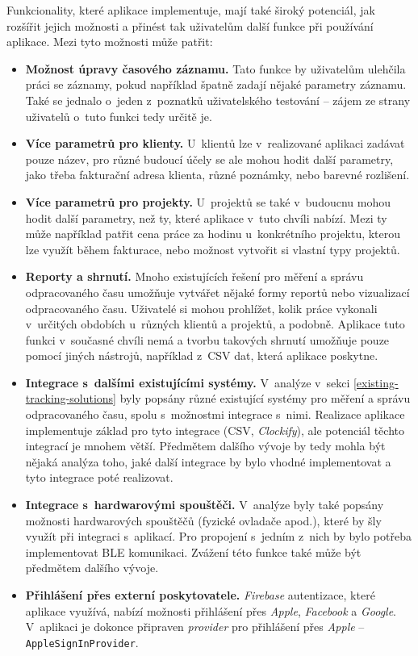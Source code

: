 Funkcionality, které aplikace implementuje, mají také široký potenciál, jak rozšířit jejich možnosti a přinést tak uživatelům další funkce při používání aplikace. Mezi tyto možnosti může patřit:
\begin{itemize}
\item\textbf{Možnost úpravy časového záznamu.} Tato funkce by uživatelům ulehčila práci se záznamy, pokud například špatně zadají nějaké parametry záznamu. Také se jednalo o~jeden z~poznatků uživatelského testování – zájem ze strany uživatelů o~tuto funkci tedy určitě je.
\item\textbf{Více parametrů pro klienty.} U~klientů lze v~realizované aplikaci zadávat pouze název, pro různé budoucí účely se ale mohou hodit další parametry, jako třeba fakturační adresa klienta, různé poznámky, nebo barevné rozlišení.
\item\textbf{Více parametrů pro projekty.} U~projektů se také v~budoucnu mohou hodit další parametry, než ty, které aplikace v~tuto chvíli nabízí. Mezi ty může například patřit cena práce za hodinu u~konkrétního projektu, kterou lze využít během fakturace, nebo možnost vytvořit si vlastní typy projektů. 
\item\textbf{Reporty a shrnutí.} Mnoho existujících řešení pro měření a správu odpracovaného času umožňuje vytvářet nějaké formy reportů nebo vizualizací odpracovaného času. Uživatelé si mohou prohlížet, kolik práce vykonali v~určitých obdobích u~různých klientů a projektů, a podobně. Aplikace tuto funkci v~současné chvíli nemá a tvorbu takových shrnutí umožňuje pouze pomocí jiných nástrojů, například z~CSV dat, která aplikace poskytne.
\item\textbf{Integrace s~dalšími existujícími systémy.} V~analýze v~sekci \ref{existing-tracking-solutions} byly popsány různé existující systémy pro měření a správu odpracovaného času, spolu s~možnostmi integrace s~nimi. Realizace aplikace implementuje základ pro tyto integrace (CSV, \emph{Clockify}), ale potenciál těchto integrací je mnohem větší. Předmětem dalšího vývoje by tedy mohla být nějaká analýza toho, jaké další integrace by bylo vhodné implementovat a tyto integrace poté realizovat.
\item\textbf{Integrace s~hardwarovými spouštěči.} V~analýze byly také popsány možnosti hardwarových spouštěčů (fyzické ovladače apod.), které by šly využít při integraci s~aplikací. Pro propojení s~jedním z~nich by bylo potřeba implementovat BLE komunikaci. Zvážení této funkce také může být předmětem dalšího vývoje.
\item\textbf{Přihlášení přes externí poskytovatele.} \emph{Firebase} autentizace, které aplikace využívá, nabízí možnosti přihlášení přes \emph{Apple}, \emph{Facebook} a \emph{Google}. V~aplikaci je dokonce připraven \emph{provider} pro přihlášení přes \emph{Apple} – \texttt{AppleSignInProvider}.
\end{itemize}

